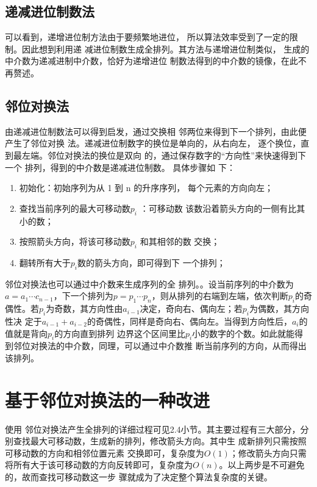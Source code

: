 \documentclass[6pt, twocolumn]{ctexart}
\begin{document}
\subsection{递减进位制数法}
可以看到，递增进位制方法由于要频繁地进位， 所以算法效率受到了一定的限制。因此想到利用递 减进位制数生成全排列。其方法与递增进位制类似， 生成的中介数为递减进制中介数，恰好为递增进位 制数法得到的中介数的镜像，在此不再赘述。
\subsection{邻位对换法}
由递减进位制数法可以得到启发，通过交换相 邻两位来得到下一个排列，由此便产生了邻位对换 法。递减进位制数字的换位是单向的，从右向左， 逐个换位，直到最左端。邻位对换法的换位是双向 的，通过保存数字的“方向性”来快速得到下一个 排列，得到的中介数是递减进位制数。 具体步骤如 下：
\begin{enumerate}
	\item 初始化：初始序列为从 1 到 n 的升序序列， 每个元素的方向向左；
	\item 查找当前序列的最大可移动数$p_i$ ：可移动数 该数沿着箭头方向的一侧有比其小的数；
	\item 按照箭头方向，将该可移动数$p_i$ 和其相邻的数 交换；
	\item 翻转所有大于$p_i$数的箭头方向，即可得到下 一个排列；
\end{enumerate}
邻位对换法也可以通过中介数来生成序列的全 排列。。设当前序列的中介数为$a = a_1\cdots c_{n-1}$，下一个排列为$p = p_1 \cdots p_n$，则从排列的右端到左端，依次判断$p_i$的奇偶性。若$p_i$为奇数，其方向性由$a_{i-1}$决定，奇向右、偶向左；若$p_i$为偶数，其方向性决 定于$a_{i-1}+a_{i-2}$的奇偶性，同样是奇向右、偶向左。当得到方向性后，$a_i$的值就是背向$p_i$的方向直到排列 边界这个区间里比$p_i$小的数字的个数。如此就能得 到邻位对换法的中介数，同理，可以通过中介数推 断当前序列的方向，从而得出该排列。
\section{基于邻位对换法的一种改进}
使用 邻位对换法产生全排列的详细过程可见2.4小节。其主要过程有三大部分，分别查找最大可移动数，生成新的排列，修改箭头方向\cite{王晓东2008算法设计与分析}。其中生 成新排列只需按照可移动数的方向和相邻位置元素 交换即可，复杂度为$O(1)$；修改箭头方向只需将所有大于该可移动数的方向反转即可，复杂度为$O(n)$。以上两步是不可避免的，故而查找可移动数这一步 骤就成为了决定整个算法复杂度\cite{}的关键。
\end{document}
